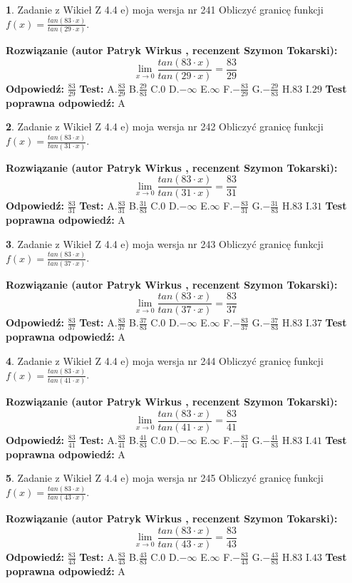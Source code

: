 \documentclass[12pt, a4paper]{article}
\theoremstyle{definition} %
\newtheorem{zad}{}
\newcommand{\zadStart}[1]{\begin{zad}#1\newline}
\newcommand{\zadStop}{\end{zad}}
\newcommand{\rozwStart}[2]{\noindent \textbf{Rozwiązanie (autor #1 , recenzent #2): }\newline}
\newcommand{\rozwStop}{\newline}
\newcommand{\odpStart}{\noindent \textbf{Odpowiedź:}\newline}
\newcommand{\odpStop}{\newline}
\newcommand{\testStart}{\noindent \textbf{Test:}\newline}
\newcommand{\testStop}{\newline}
\newcommand{\kluczStart}{\noindent \textbf{Test poprawna odpowiedź:}\newline}
\newcommand{\kluczStop}{\newline}
\begin{document}
\zadStart{Zadanie z Wikieł Z 4.4 e) moja wersja nr 241}
Obliczyć granicę funkcji $f(x)=\frac{tan(83\cdot x)}{tan(29\cdot x)}$.
\zadStop
\rozwStart{Patryk Wirkus}{Szymon Tokarski}
$$\lim\limits_{x\to 0}\frac{tan(83\cdot x)}{tan(29\cdot x)}=
\frac{83}{29}$$
\rozwStop
\odpStart
$\frac{83}{29}$
\odpStop
\testStart
A.$\frac{83}{29}$
B.$\frac{29}{83}$
C.$0$
D.$-\infty$
E.$\infty$
F.$-\frac{83}{29}$
G.$-\frac{29}{83}$
H.$83$
I.$29$
\testStop
\kluczStart
A
\kluczStop



\zadStart{Zadanie z Wikieł Z 4.4 e) moja wersja nr 242}
Obliczyć granicę funkcji $f(x)=\frac{tan(83\cdot x)}{tan(31\cdot x)}$.
\zadStop
\rozwStart{Patryk Wirkus}{Szymon Tokarski}
$$\lim\limits_{x\to 0}\frac{tan(83\cdot x)}{tan(31\cdot x)}=
\frac{83}{31}$$
\rozwStop
\odpStart
$\frac{83}{31}$
\odpStop
\testStart
A.$\frac{83}{31}$
B.$\frac{31}{83}$
C.$0$
D.$-\infty$
E.$\infty$
F.$-\frac{83}{31}$
G.$-\frac{31}{83}$
H.$83$
I.$31$
\testStop
\kluczStart
A
\kluczStop



\zadStart{Zadanie z Wikieł Z 4.4 e) moja wersja nr 243}
Obliczyć granicę funkcji $f(x)=\frac{tan(83\cdot x)}{tan(37\cdot x)}$.
\zadStop
\rozwStart{Patryk Wirkus}{Szymon Tokarski}
$$\lim\limits_{x\to 0}\frac{tan(83\cdot x)}{tan(37\cdot x)}=
\frac{83}{37}$$
\rozwStop
\odpStart
$\frac{83}{37}$
\odpStop
\testStart
A.$\frac{83}{37}$
B.$\frac{37}{83}$
C.$0$
D.$-\infty$
E.$\infty$
F.$-\frac{83}{37}$
G.$-\frac{37}{83}$
H.$83$
I.$37$
\testStop
\kluczStart
A
\kluczStop



\zadStart{Zadanie z Wikieł Z 4.4 e) moja wersja nr 244}
Obliczyć granicę funkcji $f(x)=\frac{tan(83\cdot x)}{tan(41\cdot x)}$.
\zadStop
\rozwStart{Patryk Wirkus}{Szymon Tokarski}
$$\lim\limits_{x\to 0}\frac{tan(83\cdot x)}{tan(41\cdot x)}=
\frac{83}{41}$$
\rozwStop
\odpStart
$\frac{83}{41}$
\odpStop
\testStart
A.$\frac{83}{41}$
B.$\frac{41}{83}$
C.$0$
D.$-\infty$
E.$\infty$
F.$-\frac{83}{41}$
G.$-\frac{41}{83}$
H.$83$
I.$41$
\testStop
\kluczStart
A
\kluczStop



\zadStart{Zadanie z Wikieł Z 4.4 e) moja wersja nr 245}
Obliczyć granicę funkcji $f(x)=\frac{tan(83\cdot x)}{tan(43\cdot x)}$.
\zadStop
\rozwStart{Patryk Wirkus}{Szymon Tokarski}
$$\lim\limits_{x\to 0}\frac{tan(83\cdot x)}{tan(43\cdot x)}=
\frac{83}{43}$$
\rozwStop
\odpStart
$\frac{83}{43}$
\odpStop
\testStart
A.$\frac{83}{43}$
B.$\frac{43}{83}$
C.$0$
D.$-\infty$
E.$\infty$
F.$-\frac{83}{43}$
G.$-\frac{43}{83}$
H.$83$
I.$43$
\testStop
\kluczStart
A
\kluczStop
\end{document}
